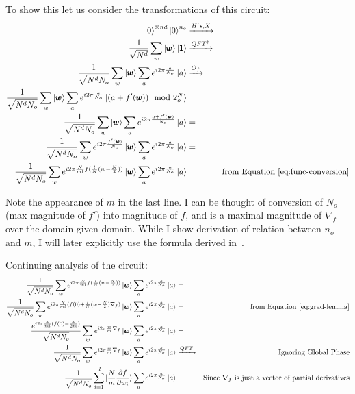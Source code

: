 \documentclass{article}
\begin{document}
To show this let us consider the transformations of this circuit:
\begin{align}
    \ket{0}^{\otimes nd}\ket{0}^{n_o} &\xrightarrow{H's, X} \\
    \frac{1}{\sqrt{N^d}} \sum\limits_{w} \ket{\pmb{w}} \ket{\pmb{1}} &\xrightarrow{QFT^\dagger} \\
    \frac{1}{\sqrt{N^d N_o}} \sum\limits_{w}\ket{\pmb{w}}\sum\limits_{a}e^{i2\pi\frac{a}{N_o}}\ket{a} &\xrightarrow{O_f} \\
    \frac{1}{\sqrt{N^d N_o}} \sum\limits_{w}\ket{\pmb{w}}\sum\limits_{a}e^{i2\pi\frac{a}{N_o}}\ket{(a + f'(\pmb{w})) \mod 2^N_o} &= \\
    \frac{1}{\sqrt{N^d N_o}} \sum\limits_{w}\ket{\pmb{w}}\sum\limits_{a}e^{i2\pi\frac{a + f'(\pmb{w})}{N_o}}\ket{a} &= \\
    \frac{1}{\sqrt{N^d N_o}} \sum\limits_{w}e^{i2\pi\frac{f'(\pmb{w})}{N_o}}\ket{\pmb{w}}\sum\limits_{a}e^{i2\pi\frac{a}{N_o}}\ket{a} &= \\
    \frac{1}{\sqrt{N^d N_o}} \sum\limits_{w}e^{i2\pi\frac{N}{ml}f(\frac{l}{N}(w - \frac{N}{2}))}\ket{\pmb{w}}\sum\limits_{a}e^{i2\pi\frac{a}{N_o}}\ket{a} & & \text{from Equation~\ref{eq:func-conversion}}
\end{align}

Note the appearance of $m$ in the last line. I can be thought of conversion of $N_o$ (max magnitude of $f'$) into magnitude of $f$, and is a maximal magnitude of $\nabla_f$ over the domain given domain.
While I show derivation of relation between $n_o$ and $m$, I will later explicitly use the formula derived in~\cite{Jordan_2005}.

Continuing analysis of the circuit:
\begin{align}
    \frac{1}{\sqrt{N^d N_o}} \sum\limits_{w}e^{i2\pi\frac{N}{ml}f(\frac{l}{N}(w - \frac{N}{2}))}\ket{\pmb{w}}\sum\limits_{a}e^{i2\pi\frac{a}{N_o}}\ket{a} &= \\
    \frac{1}{\sqrt{N^d N_o}} \sum\limits_{w}e^{i2\pi\frac{N}{ml}(f(0) + \frac{l}{N}(w - \frac{N}{2})\nabla_f)}\ket{\pmb{w}}\sum\limits_{a}e^{i2\pi\frac{a}{N_o}}\ket{a} &= & \text{from Equation~\ref{eq:grad-lemma}} \\
    \frac{e^{i2\pi\frac{N}{ml}(f(0) - \frac{N}{2m})}}{\sqrt{N^d N_o}} \sum\limits_{w}e^{i2\pi\frac{w}{m}\nabla_f}\ket{\pmb{w}}\sum\limits_{a}e^{i2\pi\frac{a}{N_o}}\ket{a} &= \\
    \frac{1}{\sqrt{N^d N_o}} \sum\limits_{w}e^{i2\pi\frac{w}{m}\nabla_f}\ket{\pmb{w}}\sum\limits_{a}e^{i2\pi\frac{a}{N_o}}\ket{a} &\xrightarrow{QFT} & \text{Ignoring Global Phase}\\
    \frac{1}{\sqrt{N^d N_o}} \sum\limits_{i = 1}^d \ket{\frac{N}{m}\frac{\partial f}{\partial w_i}}\sum\limits_{a}e^{i2\pi\frac{a}{N_o}}\ket{a} & & \text{Since $\nabla_f$ is just a vector of partial derivatives}
\end{align}
\end{document}
